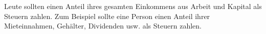 Leute sollten einen Anteil ihres gesamten Einkommens aus Arbeit und Kapital als Steuern zahlen.
Zum Beispiel sollte eine Person einen Anteil ihrer Mieteinnahmen, Gehälter, Dividenden usw. als Steuern zahlen.